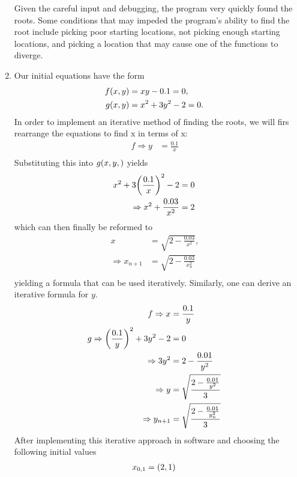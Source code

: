 \documentclass[12pt]{article}
\DeclarePairedDelimiter\rb{(}{)}
\begin{document}
\begin{enumerate}
Given the careful input and debugging, the program very quickly found the roots. Some conditions that may impeded the program's ability to find the root include picking poor starting locations, not picking enough starting locations, and picking a location that may cause one of the functions to diverge. 

\item 
	Our initial equations have the form 
\begin{align*}
	f \rb*{x,y} & =  x y  - 0.1  = 0 ,&\\
	g \rb*{ x, y } & = x^{2}   + 3 y^{2} - 2  = 0 .&\\
\end{align*}
In order to implement an iterative method of finding the roots, we will firs rearrange the equations to find x in terms of x: 
\begin{align*}
	f \Rightarrow y & =  \frac{0.1}{x} &\\
\end{align*}
Substituting this into \(g\rb*{x,y,}\) yields
\begin{align*}
	x ^{2} + 3 \rb*{\frac{0.1}{x}}^{2} -2 & =  0 &\\
	\Rightarrow x^{2} + \frac{0.03}{x^{2}} & =  2 &\\
\end{align*}
which can then finally be reformed to 
\begin{align*}
	x & =  \sqrt{2 - \frac{0.03}{x^{2}}}, &\\
	\Rightarrow x_{n+1} & =  \sqrt{2 - \frac{0.03}{x_{n}^{2}}} &\\
\end{align*}
yielding a formula that can be used iteratively. Similarly, one can derive an iterative formula for \(y\).
\begin{align*}
	f \Rightarrow x & =  \frac{0.1}{y} &\\
	g \Rightarrow \rb*{\frac{0.1}{y}}^{2} + 3 y^{2} -  2 & =  0 &\\
	\Rightarrow 3 y^{2} & =  2 - \frac{0.01}{y^{2}} &\\
	\Rightarrow y & =  \sqrt{\frac{2 - \frac{0.01}{y^{2}}}{3}} &\\
	\Rightarrow y_{n+1} & =  \sqrt{\frac{2 - \frac{0.01}{y_{n}^{2}}}{3}} &\\
\end{align*}
After implementing this iterative approach in software and choosing the following initial values
\begin{align*}
	x_{0,1} & =  \rb*{2,1 } &\\

\end{align*}
\end{enumerate}
\end{document}
